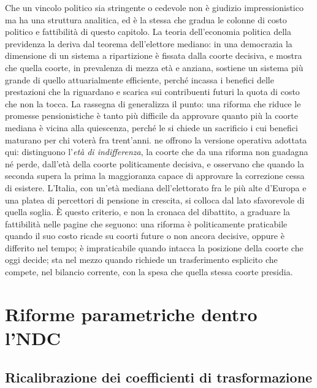 \medskip
\noindent
Che un vincolo politico sia stringente o cedevole non è giudizio
impressionistico ma ha una struttura analitica, ed è la stessa che gradua le
colonne di costo politico e fattibilità di questo capitolo. La teoria
dell'economia politica della previdenza la deriva dal teorema dell'elettore
mediano: in una democrazia la dimensione di un sistema a ripartizione è fissata
dalla coorte decisiva, e \citet{Browning1975} mostra che quella coorte, in
prevalenza di mezza età e anziana, sostiene un sistema più grande di quello
attuarialmente efficiente, perché incassa i benefici delle prestazioni che la
riguardano e scarica sui contribuenti futuri la quota di costo che non la tocca.
La rassegna di \citet{GalassoProfeta2002} generalizza il punto: una riforma che
riduce le promesse pensionistiche è tanto più difficile da approvare quanto più
la coorte mediana è vicina alla quiescenza, perché le si chiede un sacrificio i
cui benefici maturano per chi voterà fra trent'anni. \citet{SinnUebelmesser2003}
ne offrono la versione operativa adottata qui: distinguono l'\emph{età di
indifferenza}, la coorte che da una riforma non guadagna né perde, dall'età
della coorte politicamente decisiva, e osservano che quando la seconda supera la
prima la maggioranza capace di approvare la correzione cessa di esistere.
L'Italia, con un'età mediana dell'elettorato fra le più alte d'Europa e una
platea di percettori di pensione in crescita, si colloca dal lato sfavorevole di
quella soglia. È questo criterio, e non la cronaca del dibattito, a graduare la
fattibilità nelle pagine che seguono: una riforma è politicamente praticabile
quando il suo costo ricade su coorti future o non ancora decisive, oppure è
differito nel tempo; è impraticabile quando intacca la posizione della coorte
che oggi decide; sta nel mezzo quando richiede un trasferimento esplicito che
compete, nel bilancio corrente, con la spesa che quella stessa coorte presidia.

\section{Riforme parametriche dentro l'NDC}
\label{sec:parametriche}

\subsection{Ricalibrazione dei coefficienti di trasformazione}
\label{sub:coefficienti}

